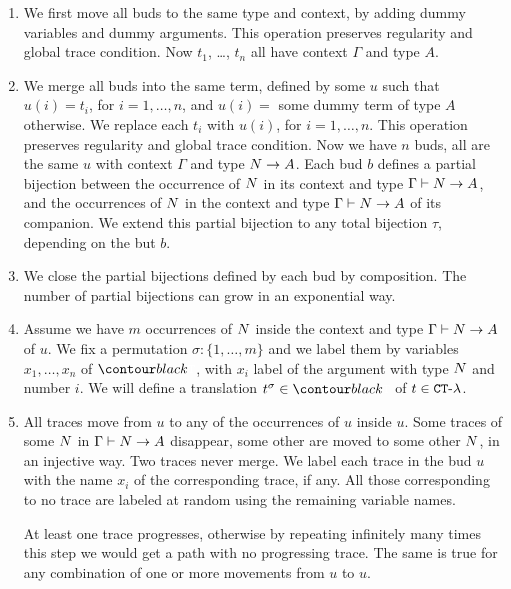 \documentclass{article}
\begin{document}
\begin{enumerate}

\item
We first move all buds to the same type and context, by adding dummy variables and dummy arguments.
This operation preserves regularity and global trace condition.
Now $t_1$, \ldots, $t_n$ all have context $\Gamma$ and type $A$.

\item
We merge all buds into the same term, defined by some $u$ such that $u(i)=t_i$, for $i=1, \ldots, n$,
and $u(i)=$ some dummy term of type $A$ otherwise. We replace each $t_i$ with $u(i)$, 
for $i=1, \ldots, n$.
This operation preserves regularity and global trace condition.
Now we have $n$ buds, all are the same $u$ with context $\Gamma$ and type ${N} \rightarrow A$.
Each bud $b$ defines a partial bijection between the occurrence of ${N}$ in its context and type
$\Gamma \vdash {N} \rightarrow A$, and the occurrences of ${N}$ in the context and type
$\Gamma \vdash {N} \rightarrow A$ of its companion. 
We extend this partial bijection to any total bijection $\tau$, depending on the but $b$.

\item
We close the partial bijections defined by each bud by composition. The number of partial 
bijections can grow in an exponential  way.

\item
Assume we have $m$ occurrences of ${N}$ inside the context and type 
$\Gamma \vdash {N} \rightarrow A$ of $u$.
We fix a permutation $\sigma:\{1, \ldots, m\}$ 
and we label them by variables $x_1, \ldots, x_n$ of $\systemT$,
with $x_i$ label of the argument with type ${N}$ and number $i$.
We will define a translation $t^\sigma \in \systemT$ of  $t \in { {\tt CT} \mbox{-} \lambda}$.

\item
All traces move from $u$ to any of the occurrences of $u$ inside $u$. 
Some traces of some ${N}$
in $\Gamma \vdash {N} \rightarrow A$ disappear, some other are moved to some other ${N}$,
in an injective way. Two traces never merge.
We label each trace in the bud $u$ with the name $x_i$ of the corresponding trace, if any.
All those corresponding to no trace are labeled at random using the remaining variable names.

At least one trace progresses, otherwise by repeating infinitely many times this step we would get a
path with no progressing trace. The same is true for any combination of one or more movements
from $u$ to $u$. 


\end{enumerate}
\end{document}

